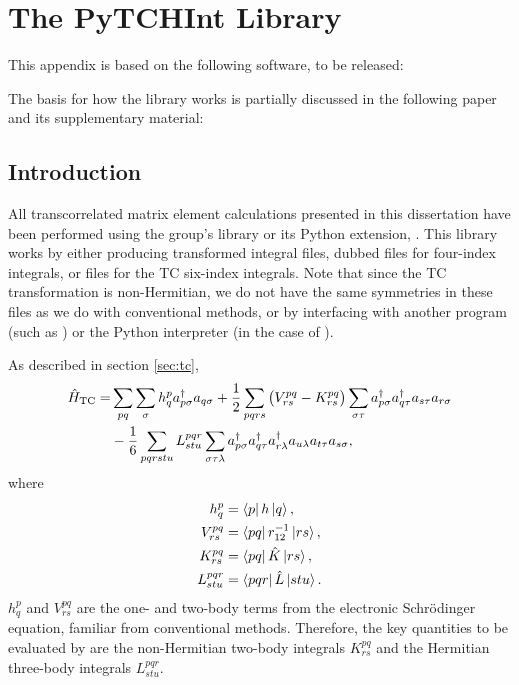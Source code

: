 \chapter{The PyTCHInt Library}
\label{chap:pytchint}

This appendix is based on the following software, to be released:\\

The basis for how the library works is partially discussed in the following paper and its supplementary material: \\

\section{Introduction}

All transcorrelated matrix element calculations presented in this dissertation have been performed using the group's \tchint library or its Python extension, \pytchint. This library works by either producing transformed integral files, dubbed \fcidump files for four-index integrals,\supercite{knowlesDeterminant1989} or \tcdump files for the \gls{TC} six-index integrals. Note that since the \gls{TC} transformation is non-Hermitian, we do not have the same symmetries in these files as we do with conventional methods, or by interfacing with another program (such as \neci) or the Python interpreter (in the case of \pytchint).

As described in section \ref{sec:tc},
\begin{equation}
\begin{split}
    \hat H_\mathrm{TC} = &\sum_{pq}\sum_\sigma h_q^p a_{p\sigma}^\dagger a_{q\sigma}
    + \frac{1}{2} \sum_{pqrs} \big(V_{rs}^{pq} - K_{rs}^{pq}\big) \sum_{\sigma\tau}
    a_{p\sigma}^\dagger a_{q\tau}^\dagger a_{s\tau} a_{r\sigma} \\
    &- \frac{1}{6} \sum_{pqrstu} L_{stu}^{pqr}\sum_{\sigma\tau\lambda}
    a_{p\sigma}^\dagger a_{q\tau}^\dagger a_{r\lambda}^\dagger a_{u\lambda} a_{t\tau} a_{s\sigma},
\end{split}
\end{equation}
where
\begin{equation}
\begin{split}
    h_q^p &= \bra{p}h\ket{q}, \\
    V_{rs}^{pq} &= \bra{p q } r_{12}^{-1} \ket{ r s}, \\
    K_{rs}^{pq} &= \bra{p q } \hat{K} \ket{ r s}, \\
    L_{stu}^{pqr} &= \bra{p q r } \hat{L} \ket{s t u}.
\end{split}
\end{equation}
$h_q^p$ and $V_{rs}^{pq}$ are the one- and two-body terms from the electronic Schr\"odinger equation, familiar from conventional methods. Therefore, the key quantities to be evaluated by \tchint are the non-Hermitian two-body integrals $K_{rs}^{pq}$ and the Hermitian three-body integrals $L_{stu}^{pqr}$.

